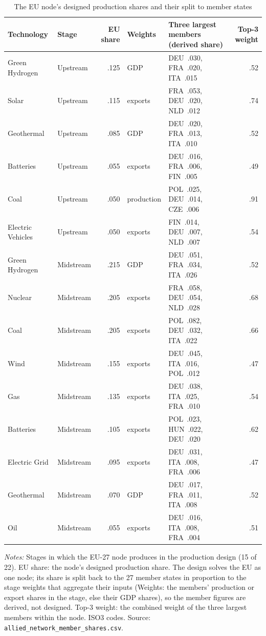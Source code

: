 \begin{table}[htbp]
\centering
\begin{threeparttable}
\caption{The EU node's designed production shares and their split to member states}
\label{tab:network_eu_split}
\footnotesize
\begin{tabular}{@{}l l r l l r@{}}
\toprule
Technology & Stage & EU share & Weights & Three largest members (derived share) & Top-3 weight \\
\midrule
Green Hydrogen & Upstream & .125 & GDP & DEU~.030, FRA~.020, ITA~.015 & .52 \\
Solar & Upstream & .115 & exports & FRA~.053, DEU~.020, NLD~.012 & .74 \\
Geothermal & Upstream & .085 & GDP & DEU~.020, FRA~.013, ITA~.010 & .52 \\
Batteries & Upstream & .055 & exports & DEU~.016, FRA~.006, FIN~.005 & .49 \\
Coal & Upstream & .050 & production & POL~.025, DEU~.014, CZE~.006 & .91 \\
Electric Vehicles & Upstream & .050 & exports & FIN~.014, DEU~.007, NLD~.007 & .54 \\
Green Hydrogen & Midstream & .215 & GDP & DEU~.051, FRA~.034, ITA~.026 & .52 \\
Nuclear & Midstream & .205 & exports & FRA~.058, DEU~.054, NLD~.028 & .68 \\
Coal & Midstream & .205 & exports & POL~.082, DEU~.032, ITA~.022 & .66 \\
Wind & Midstream & .155 & exports & DEU~.045, ITA~.016, POL~.012 & .47 \\
Gas & Midstream & .135 & exports & DEU~.038, ITA~.025, FRA~.010 & .54 \\
Batteries & Midstream & .105 & exports & POL~.023, HUN~.022, DEU~.020 & .62 \\
Electric Grid & Midstream & .095 & exports & DEU~.031, ITA~.008, FRA~.006 & .47 \\
Geothermal & Midstream & .070 & GDP & DEU~.017, FRA~.011, ITA~.008 & .52 \\
Oil & Midstream & .055 & exports & DEU~.016, ITA~.008, FRA~.004 & .51 \\
\bottomrule
\end{tabular}
\begin{tablenotes}[flushleft]\footnotesize
\item \emph{Notes:} Stages in which the EU-27 node produces in the production design (15 of 22). EU share: the node's designed production share. The design solves the EU as one node; its share is split back to the 27 member states in proportion to the stage weights that aggregate their inputs (Weights: the members' production or export shares in the stage, else their GDP shares), so the member figures are derived, not designed. Top-3 weight: the combined weight of the three largest members within the node. ISO3 codes. Source: \texttt{allied\_network\_member\_shares.csv}.
\end{tablenotes}
\end{threeparttable}
\end{table}
